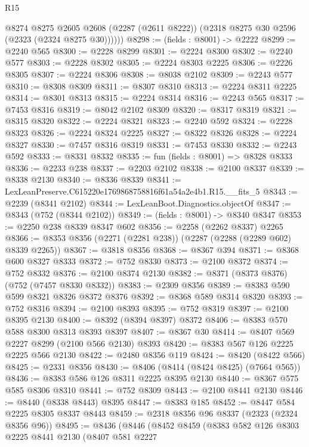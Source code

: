 \begin{lexlean}{R15}
\begin{coremodule}
        @8274
          @8275
          @2605
          @2608
          (@2287 (@2611 @8222))
          (@2318 @8275 @30 @2596 (@2323 (@2324 @8275 @30))))))
@8298 := (fields : @8001) -> @2222
@8299 := @2240 @565
@8300 := @2228 @8299
@8301 := @2224 @8300
@8302 := @2240 @577
@8303 := @2228 @8302
@8305 := @2224 @8303 @2225
@8306 := @2226 @8305
@8307 := @2224 @8306
@8308 := @8038 @2102
@8309 := @2243 @577
@8310 := @8308 @8309
@8311 := @8307 @8310
@8313 := @2224 @8311 @2225
@8314 := @8301 @8313
@8315 := @2224 @8314
@8316 := @2243 @565
@8317 := @7453 @8316
@8319 := @8042 @2102 @8309
@8320 := @8317 @8319
@8321 := @8315 @8320
@8322 := @2224 @8321
@8323 := @2240 @592
@8324 := @2228 @8323
@8326 := @2224 @8324 @2225
@8327 := @8322 @8326
@8328 := @2224 @8327
@8330 := @7457 @8316 @8319
@8331 := @7453 @8330
@8332 := @2243 @592
@8333 := @8331 @8332
@8335 := fun (fields : @8001) => @8328 @8333
@8336 := @2233 @238
@8337 := @2203 @2102
@8338 := @2100 @8337
@8339 := @8338 @2130
@8340 := @8336 @8339
@8341 := LexLeanPreserve.C615220e1769868758816f61a54a2e4b1.R15.__fits_5
@8343 := @2239 (@8341 @2102)
@8344 := LexLeanBoot.Diagnostics.objectOf
@8347 := @8343 (@752 (@8344 @2102))
@8349 := (fields : @8001) -> @8340 @8347
@8353 := @2250 @238 @8339 @8347 @602
@8356 := @2258 (@2262 @8337) @2265
@8366 := @8353 @8356 (@2271 (@2281 @238)) (@2287 (@2288 (@2289 @602) @8339 @2265))
@8367 := @3818 @8356
@8368 := @8367 @394
@8371 := @8368 @600 @8327 @8333
@8372 := @752 @8330
@8373 := @2100 @8372
@8374 := @752 @8332
@8376 := @2100 @8374 @2130
@8382 := @8371 (@8373 @8376) (@752 (@7457 @8330 @8332))
@8383 := @2309 @8356
@8389 := @8383 @590 @599 @8321 @8326 @8372 @8376
@8392 := @8368 @589 @8314 @8320
@8393 := @752 @8316
@8394 := @2100 @8393
@8395 := @752 @8319
@8397 := @2100 @8395 @2130
@8400 := @8392 (@8394 @8397) @8372
@8406 := @8383 @570 @588 @8300 @8313 @8393 @8397
@8407 := @8367 @30
@8414 := @8407 @569 @2227 @8299 (@2100 @566 @2130) @8393
@8420 := @8383 @567 @126 @2225 @2225 @566 @2130
@8422 := @2480 @8356 @119
@8424 := @8420 (@8422 @566)
@8425 := @2331 @8356
@8430 := @8406 (@8414 (@8424 @8425) (@7664 @565))
@8436 := @8383 @586 @126 @8311 @2225 @8395 @2130
@8440 := @8367 @575 @585 @8306 @8310
@8441 := @752 @8309
@8443 := @2100 @8441 @2130
@8446 := @8440 (@8338 @8443) @8395
@8447 := @8383 @185
@8452 := @8447 @584 @2225 @8305 @8337 @8443
@8459 := @2318 @8356 @96 @8337 (@2323 (@2324 @8356 @96))
@8495 := @8436
    (@8446
      (@8452
        @8459
        (@8383
          @582
          @126
          @8303
          @2225
          @8441
          @2130
          (@8407
            @581
            @2227

\end{coremodule}
\end{lexlean}
